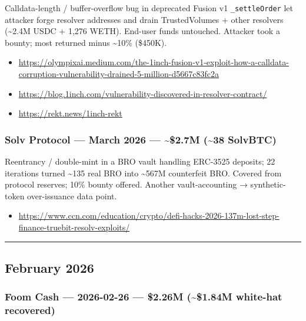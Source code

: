 Calldata-length / buffer-overflow bug in deprecated Fusion v1 \texttt{\_settleOrder} let attacker forge resolver addresses and drain TrustedVolumes + other resolvers (\textasciitilde2.4M USDC + 1,276 WETH). End-user funds untouched. Attacker took a bounty; most returned minus \textasciitilde10\% (\$450K).

\begin{itemize}
\tightlist
\item
  \url{https://olympixai.medium.com/the-1inch-fusion-v1-exploit-how-a-calldata-corruption-vulnerability-drained-5-million-d5667c83fc2a}
\item
  \url{https://blog.1inch.com/vulnerability-discovered-in-resolver-contract/}
\item
  \url{https://rekt.news/1inch-rekt}
\end{itemize}

\subsubsection{Solv Protocol --- March 2026 --- \textasciitilde\$2.7M (\textasciitilde38 SolvBTC)}\label{solv-protocol-march-2026-2.7m-38-solvbtc}

Reentrancy / double-mint in a BRO vault handling ERC-3525 deposits; 22 iterations turned \textasciitilde135 real BRO into \textasciitilde567M counterfeit BRO. Covered from protocol reserves; 10\% bounty offered. Another vault-accounting → synthetic-token over-issuance data point.

\begin{itemize}
\tightlist
\item
  \url{https://www.ccn.com/education/crypto/defi-hacks-2026-137m-lost-step-finance-truebit-resolv-exploits/}
\end{itemize}

\begin{center}\rule{0.5\linewidth}{0.5pt}\end{center}

\subsection{February 2026}\label{february-2026}

\subsubsection{Foom Cash --- 2026-02-26 --- \$2.26M (\textasciitilde\$1.84M white-hat recovered)}\label{foom-cash-2026-02-26-2.26m-1.84m-white-hat-recovered}

